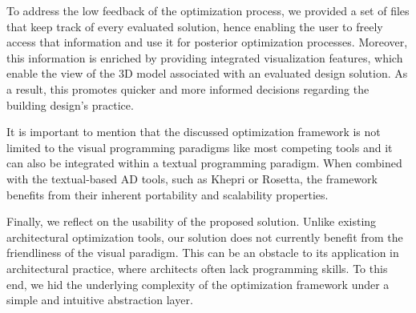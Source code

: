 To address the low feedback of the optimization process, we provided a set of files that keep track of every evaluated solution, hence enabling the user to freely access that information and use it for posterior optimization processes. Moreover, this information is enriched by providing integrated visualization features, which enable the view of the 3D model associated with an evaluated design solution. As a result, this promotes quicker and more informed decisions regarding the building design's practice.

It is important to mention that the discussed optimization framework is not limited to the visual programming paradigms like most competing tools and it can also be integrated within a textual programming paradigm. When combined with the textual-based \ac{AD} tools, such as Khepri or Rosetta, the framework benefits from their inherent portability and scalability properties. 

Finally, we reflect on the usability of the proposed solution. Unlike existing architectural optimization tools, our solution does not currently benefit from the friendliness of the visual paradigm. This can be an obstacle to its application in architectural practice, where architects often lack programming skills. To this end, we hid the underlying complexity of the optimization framework under a simple and intuitive abstraction layer. 


